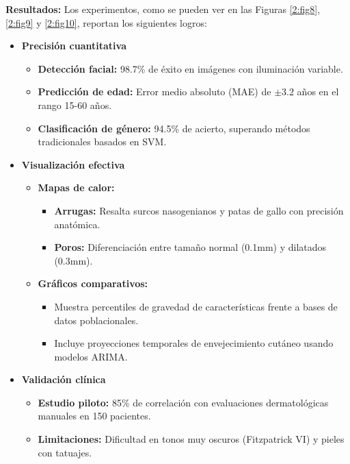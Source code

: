 \textbf{Resultados:}
Los experimentos, como se pueden ver en las Figuras \ref{2:fig8}, \ref{2:fig9} y \ref{2:fig10}, reportan los siguientes logros:


\begin{itemize}
    \item \textbf{Precisión cuantitativa}
	\begin{itemize}[label=$\bullet$, leftmargin=1em]
		\item \textbf{Detección facial:} 98.7\% de éxito en imágenes con iluminación variable.
		\item \textbf{Predicción de edad:} Error medio absoluto (MAE) de $\pm 3.2$ años en el rango 15-60 años.
		\item \textbf{Clasificación de género:} 94.5\% de acierto, superando métodos tradicionales basados en SVM.
	\end{itemize}

	\item \textbf{Visualización efectiva}
	\begin{itemize}[label=$\bullet$, leftmargin=1em]
		\item \textbf{Mapas de calor:}
		\begin{itemize}[label=$\circ$, leftmargin=1em]
			\item \textbf{Arrugas:} Resalta surcos nasogenianos y patas de gallo con precisión anatómica.
			\item \textbf{Poros:} Diferenciación entre tamaño normal (0.1mm) y dilatados (0.3mm).
		\end{itemize}
		\item \textbf{Gráficos comparativos:}
		\begin{itemize}[label=$\circ$, leftmargin=1em]
			\item Muestra percentiles de gravedad de características frente a bases de datos poblacionales.
			\item Incluye proyecciones temporales de envejecimiento cutáneo usando modelos ARIMA.
		\end{itemize}
	\end{itemize}


	\item \textbf{Validación clínica}
	\begin{itemize}[label=$\bullet$, leftmargin=1em]
		\item \textbf{Estudio piloto:} 85\% de correlación con evaluaciones dermatológicas manuales en 150 pacientes.
		\item \textbf{Limitaciones:} Dificultad en tonos muy oscuros (Fitzpatrick VI) y pieles con tatuajes.
	\end{itemize}

\end{itemize}

